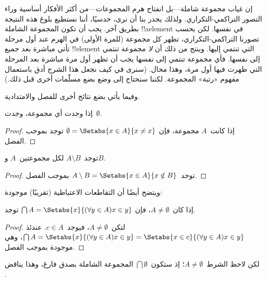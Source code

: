 \documentclass[../../../include/open-logic-section]{subfiles}
\begin{document}
إن غياب مجموعة شاملة---بل انفتاح هرم المجموعات---من أكثر الأفكار
أساسية وراء التصور التراكمي-التكراري. ولذلك يجدر بنا أن نرى، حدسيًا،
أننا نستطيع بلوغ هذه النتيجة بطريق آخر. يجب أن تكون المجموعة الشاملة
!!a{element} في نفسها. لكن بحسب تصورنا التراكمي-التكراري، تظهر كل
مجموعة (للمرة الأولى) في الهرم عند أول مرحلة تأتي مباشرة بعد جميع
!!{element} التي تنتمي إليها. وينتج من ذلك أن \emph{لا} مجموعة تنتمي
إلى نفسها. فأي مجموعة تنتمي إلى نفسها يجب أن تظهر أول مرة مباشرة بعد
المرحلة التي ظهرت فيها أول مرة، وهذا محال. (سنرى في
 كيف نجعل هذا الشرح أدق باستعمال
مفهوم «رتبة» المجموعة. لكننا سنحتاج إلى وضع بضع مسلّمات أخرى قبل ذلك.)

وفيما يأتي بضع نتائج أخرى للفصل والامتدادية.

\begin{prop}
إذا وجدت أي مجموعة، وجدت~$\emptyset$.
\end{prop}

\begin{proof}
إذا كانت~$A$ مجموعة، فإن
$\emptyset = \Setabs{x \in A}{x \neq x}$ توجد بموجب الفصل.
\end{proof}

\begin{prop}
توجد~$A \setminus B$ لكل مجموعتين~$A$ و$B$.
\end{prop}

\begin{proof}
توجد~$A \setminus B = \Setabs{x \in A}{x \notin B}$ بموجب الفصل.
\end{proof}

ويتضح أيضًا أن التقاطعات الاعتباطية (تقريبًا) موجودة:

\begin{prop}
إذا كان~$A \neq \emptyset$، فإن
$\bigcap A = \Setabs{x}{(\forall y \in A)x \in y}$ توجد.
\end{prop}

\begin{proof}
لتكن~$A \neq \emptyset$، فيوجد~$c \in A$. عندئذ
$\bigcap A = \Setabs{x}{(\forall y \in A)x \in y} =
\Setabs{x \in c}{(\forall y \in A)x \in y}$، وهي موجودة بموجب الفصل.
\end{proof}

لكن لاحظ الشرط~$A \neq \emptyset$؛ إذ ستكون~$\bigcap \emptyset$
المجموعة الشاملة بصدق فارغ، وهذا يناقض
.
\end{document}
